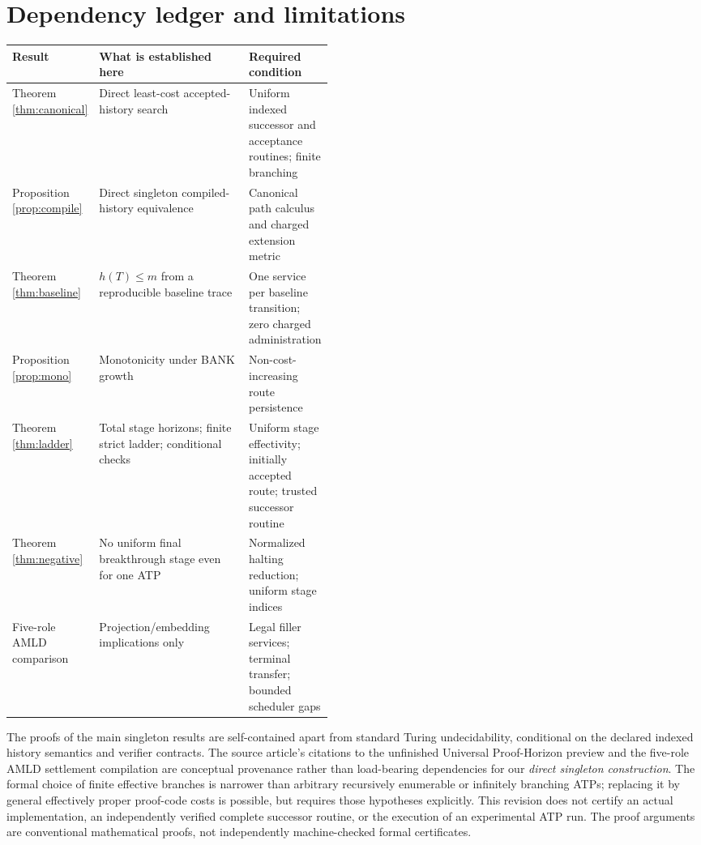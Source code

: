 \documentclass[11pt]{article}
\theoremstyle{definition}
\begin{document}
\section{Dependency ledger and limitations}
\begin{center}\small
\begin{tabularx}{\linewidth}{@{}p{0.22\linewidth}Y p{0.24\linewidth}@{}}
\toprule
\textbf{Result} & \textbf{What is established here} & \textbf{Required condition}\\\midrule
Theorem \ref{thm:canonical} & Direct least-cost accepted-history search & Uniform indexed successor and acceptance routines; finite branching\\
Proposition \ref{prop:compile} & Direct singleton compiled-history equivalence & Canonical path calculus and charged extension metric\\
Theorem \ref{thm:baseline} & $h(T)\le m$ from a reproducible baseline trace & One service per baseline transition; zero charged administration\\
Proposition \ref{prop:mono} & Monotonicity under BANK growth & Non-cost-increasing route persistence\\
Theorem \ref{thm:ladder} & Total stage horizons; finite strict ladder; conditional checks & Uniform stage effectivity; initially accepted route; trusted successor routine\\
Theorem \ref{thm:negative} & No uniform final breakthrough stage even for one ATP & Normalized halting reduction; uniform stage indices\\
Five-role AMLD comparison & Projection/embedding implications only & Legal filler services; terminal transfer; bounded scheduler gaps\\
\bottomrule
\end{tabularx}
\end{center}

The proofs of the main singleton results are self-contained apart from standard Turing undecidability, conditional on the declared indexed history semantics and verifier contracts. The source article's citations to the unfinished Universal Proof-Horizon preview and the five-role AMLD settlement compilation are conceptual provenance rather than load-bearing dependencies for our \emph{direct singleton construction}. The formal choice of finite effective branches is narrower than arbitrary recursively enumerable or infinitely branching ATPs; replacing it by general effectively proper proof-code costs is possible, but requires those hypotheses explicitly. This revision does not certify an actual implementation, an independently verified complete successor routine, or the execution of an experimental ATP run. The proof arguments are conventional mathematical proofs, not independently machine-checked formal certificates.
\end{document}

